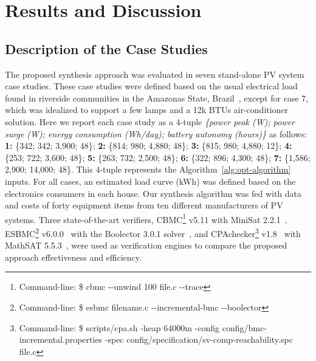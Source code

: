 \documentclass[10pt,journal,compsoc]{IEEEtran}
\begin{document}
\section{Results and Discussion}
\subsection{Description of the Case Studies}

The proposed synthesis approach was evaluated in seven stand-alone PV system case studies.
These case studies were defined based on the usual electrical load found in riverside communities in the Amazonas State, Brazil~\cite{TrindadeCordeiro19,Agrener2013}, except for case 7, which was idealized to support a few lamps and a 12k BTUs air-conditioner solution. 
Here we report each case study as a 4-tuple \textit{\{power peak (W); power surge (W); energy consumption (Wh/day); battery autonomy (hours)\}} as follows:
\textbf{1:} \{342; 342; 3,900; 48\}; \textbf{2:} \{814; 980; 4,880; 48\}; \textbf{3:} \{815; 980; 4,880; 12\}; \textbf{4:} \{253; 722; 3,600; 48\}; \textbf{5:} \{263; 732; 2,500; 48\}; \textbf{6:} \{322; 896; 4,300; 48\}; \textbf{7:} \{1,586; 2,900; 14,000; 48\}. This 4-tuple represents the Algorithm~\ref{alg:opt-algorithm} inputs. For all cases, an estimated load curve (kWh) was defined based on the electronics consumers in each house. Our synthesis algorithm was fed with data and costs of forty equipment items from ten different manufacturers of PV systems. 
%
Three state-of-the-art verifiers, CBMC\footnote{Command-line: \$ cbmc -\phantom{}-unwind 100 file.c -\phantom{}-trace} v5.11 with MiniSat 2.2.1~\cite{Kroening}, ESBMC\footnote{Command-line: \$ esbmc filename.c -\phantom{}-incremental-bmc -\phantom{}-boolector} v6.0.0~\cite{esbmc2018} with the Boolector 3.0.1 solver~\cite{Brummayer}, and CPAchecker\footnote{Command-line: \$ scripts/cpa.sh -heap 64000m -config config/bmc-incremental.properties -spec config/specification/sv-comp-reachability.spc file.c} v1.8~\cite{Beyer2011} with MathSAT 5.5.3~\cite{mathsat5}, were used as verification engines to compare the proposed approach effectiveness and efficiency. 

\end{document}
